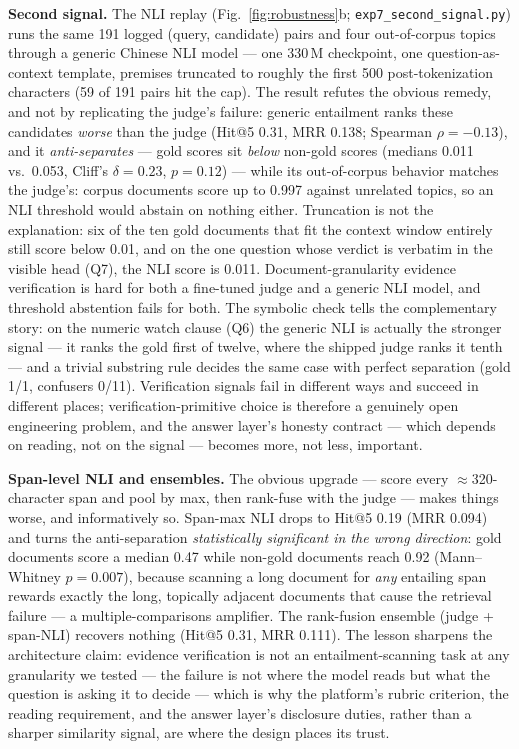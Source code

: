 \documentclass[preprint,12pt]{elsarticle}
\begin{document}
\textbf{Second signal.} The NLI replay
(Fig.~\ref{fig:robustness}b; \texttt{exp7\_second\_signal.py})
runs the same 191 logged (query, candidate) pairs and four out-of-corpus
topics through a generic Chinese NLI model --- one 330\,M checkpoint, one
question-as-context template, premises truncated to roughly the first 500
post-tokenization characters (59 of 191 pairs hit the cap). The result
refutes the obvious remedy, and not by replicating the judge's failure:
generic entailment ranks these candidates \emph{worse} than the judge
(Hit@5 0.31, MRR 0.138; Spearman $\rho = -0.13$), and it
\emph{anti-separates} --- gold scores sit \emph{below} non-gold scores
(medians 0.011 vs.\ 0.053, Cliff's $\delta = 0.23$, $p = 0.12$) --- while
its out-of-corpus behavior matches the judge's: corpus documents score up
to 0.997 against unrelated topics, so an NLI threshold would abstain on
nothing either. Truncation is not the explanation: six of the ten gold
documents that fit the context window entirely still score below 0.01,
and on the one question whose verdict is verbatim in the visible head
(Q7), the NLI
score is 0.011. Document-granularity evidence verification is hard for
both a fine-tuned judge and a generic NLI model, and threshold
abstention fails for both. The symbolic check tells the complementary
story: on the numeric watch clause (Q6) the generic NLI is actually the
stronger signal --- it ranks the gold first of twelve, where the shipped
judge ranks it tenth --- and a trivial substring rule decides the same
case with perfect separation (gold 1/1, confusers 0/11). Verification
signals fail in different ways and succeed in different places;
verification-primitive choice is therefore a genuinely open engineering
problem, and the answer layer's
honesty contract --- which depends on reading, not on the signal ---
becomes more, not less, important.

\textbf{Span-level NLI and ensembles.} The obvious upgrade --- score
every $\approx$320-character span and pool by max, then rank-fuse with
the judge --- makes things worse, and informatively so. Span-max NLI
drops to Hit@5 0.19 (MRR 0.094) and turns the anti-separation
\emph{statistically significant in the wrong direction}: gold documents
score a median 0.47 while non-gold documents reach 0.92
(Mann--Whitney $p = 0.007$), because scanning a long document for
\emph{any} entailing span rewards exactly the long, topically adjacent
documents that cause the retrieval failure --- a multiple-comparisons
amplifier. The rank-fusion ensemble (judge + span-NLI) recovers nothing
(Hit@5 0.31, MRR 0.111). The lesson sharpens the architecture claim:
evidence verification is not an entailment-scanning task at any
granularity we tested --- the failure is not where the model reads but
what the question is asking it to decide --- which is why the platform's
rubric criterion, the reading requirement, and the answer layer's
disclosure duties, rather than a sharper similarity signal, are where
the design places its trust.
\end{document}
